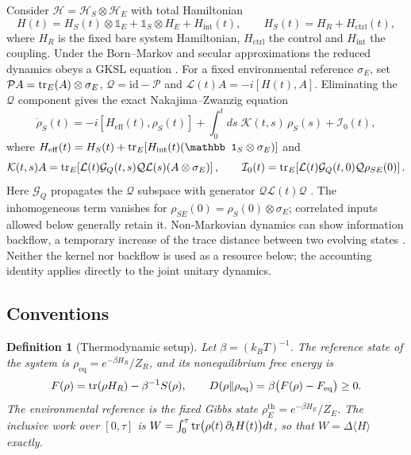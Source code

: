 \documentclass[12pt]{article}
\newtheorem{definition}[theorem]{Definition}
\begin{document}
Consider $\mathcal H=\mathcal H_S\otimes\mathcal H_E$ with total Hamiltonian
\begin{equation}
\label{eq:H_total}
H(t)=H_S(t)\otimes\mathbb 1_E+\mathbb 1_S\otimes H_E+H_{\mathrm{int}}(t),\qquad H_S(t)=H_R+H_{\mathrm{ctrl}}(t),
\end{equation}
where $H_R$ is the fixed bare system Hamiltonian, $H_{\mathrm{ctrl}}$ the control and $H_{\mathrm{int}}$ the coupling. Under the Born--Markov and secular approximations the reduced dynamics obeys a GKSL equation \cite{Lindblad1976,GKS1976}. For a fixed environmental reference $\sigma_E$, set $\mathcal P A=\tr_E(A)\otimes\sigma_E$, $\mathcal Q=\mathrm{id}-\mathcal P$ and $\mathcal L(t)A=-i[H(t),A]$. Eliminating the $\mathcal Q$ component gives the exact Nakajima--Zwanzig equation
\begin{equation}
\label{eq:NZ}
\dot\rho_S(t)=-i[H_{\mathrm{eff}}(t),\rho_S(t)]+\int_0^tds\;\mathcal K(t,s)\,\rho_S(s)+\mathcal I_0(t),
\end{equation}
where $H_{\mathrm{eff}}(t)=H_S(t)+\tr_E[H_{\mathrm{int}}(t)(\mathbb 1_S\otimes\sigma_E)]$ and
\[
 \mathcal K(t,s)A=\tr_E\!\left[\mathcal L(t)\mathcal G_Q(t,s)
       \mathcal Q\mathcal L(s)(A\otimes\sigma_E)\right],\qquad
 \mathcal I_0(t)=\tr_E\!\left[\mathcal L(t)\mathcal G_Q(t,0)
       \mathcal Q\rho_{SE}(0)\right].
\]
Here $\mathcal G_Q$ propagates the $\mathcal Q$ subspace with generator $\mathcal Q\mathcal L(t)\mathcal Q$ \cite{Nakajima1958,Zwanzig1960}. The inhomogeneous term vanishes for $\rho_{SE}(0)=\rho_S(0)\otimes\sigma_E$; correlated inputs allowed below generally retain it. Non-Markovian dynamics can show information backflow, a temporary increase of the trace distance between two evolving states \cite{BreuerLainePiilo2009}. Neither the kernel nor backflow is used as a resource below; the accounting identity applies directly to the joint unitary dynamics.

\subsection{Conventions}
\label{subsec:thermo}

\begin{definition}[Thermodynamic setup]
\label{def:thermo_setup}
Let $\beta=(k_BT)^{-1}$. The reference state of the system is $\rho_{\mathrm{eq}}=e^{-\beta H_R}/Z_R$, and its nonequilibrium free energy is
\begin{equation}
\label{eq:F_neq}
F(\rho)=\tr(\rho H_R)-\beta^{-1}S(\rho),\qquad
D(\rho\Vert\rho_{\mathrm{eq}})=\beta\bigl(F(\rho)-F_{\mathrm{eq}}\bigr)\ge0 .
\end{equation}
The environmental reference is the fixed Gibbs state $\rho_E^{\mathrm{th}}=e^{-\beta H_E}/Z_E$. The inclusive work over $[0,\tau]$ is $W=\int_0^\tau\tr\bigl(\rho(t)\,\partial_tH(t)\bigr)dt$, so that $W=\Delta\langle H\rangle$ exactly.
\end{definition}
\end{document}

